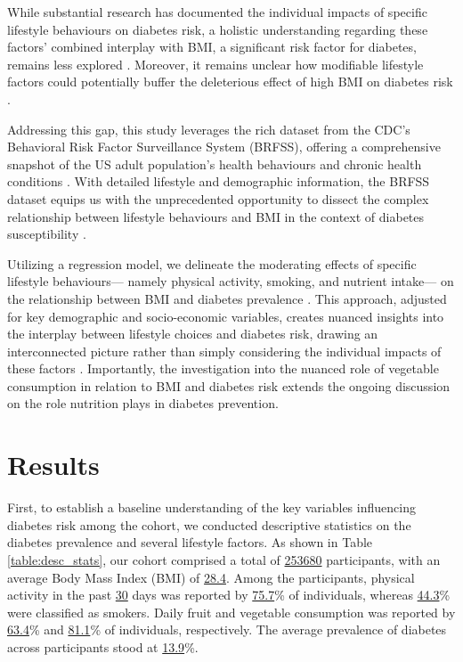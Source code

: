 \documentclass[11pt]{article}
\begin{document}
While substantial research has documented the individual impacts of specific lifestyle behaviours on diabetes risk, a holistic understanding regarding these factors' combined interplay with BMI, a significant risk factor for diabetes, remains less explored \cite{Li2017TimeTO, Bancks2021Type2D}. Moreover, it remains unclear how modifiable lifestyle factors could potentially buffer the deleterious effect of high BMI on diabetes risk \cite{Schnurr2020ObesityUL, Li2017TimeTO}.

Addressing this gap, this study leverages the rich dataset from the CDC's Behavioral Risk Factor Surveillance System (BRFSS), offering a comprehensive snapshot of the US adult population's health behaviours and chronic health conditions \cite{Matthews2017HealthRelatedBB, Iachan2016NationalWO}. With detailed lifestyle and demographic information, the BRFSS dataset equips us with the unprecedented opportunity to dissect the complex relationship between lifestyle behaviours and BMI in the context of diabetes susceptibility \cite{Tung2017RacialAE, Liu2016PrevalenceOH}.

Utilizing a regression model, we delineate the moderating effects of specific lifestyle behaviours— namely physical activity, smoking, and nutrient intake— on the relationship between BMI and diabetes prevalence \cite{Sambola2003RoleOR, Stumvoll2000UseOT}. This approach, adjusted for key demographic and socio-economic variables, creates nuanced insights into the interplay between lifestyle choices and diabetes risk, drawing an interconnected picture rather than simply considering the individual impacts of these factors \cite{Reis2011LifestyleFA, Ng2019SmokingDD}. Importantly, the investigation into the nuanced role of vegetable consumption in relation to BMI and diabetes risk extends the ongoing discussion on the role nutrition plays in diabetes prevention.

\section*{Results}

First, to establish a baseline understanding of the key variables influencing diabetes risk among the cohort, we conducted descriptive statistics on the diabetes prevalence and several lifestyle factors. As shown in Table \ref{table:desc_stats}, our cohort comprised a total of \hyperlink{R0a}{253680} participants, with an average Body Mass Index (BMI) of \hyperlink{A1a}{28.4}. Among the participants, physical activity in the past \hyperlink{A8a}{30} days was reported by \hyperlink{results0}{75.7}\% of individuals, whereas \hyperlink{results1}{44.3}\% were classified as smokers. Daily fruit and vegetable consumption was reported by \hyperlink{results2}{63.4}\% and \hyperlink{results3}{81.1}\% of individuals, respectively. The average prevalence of diabetes across participants stood at \hyperlink{results4}{13.9}\%.
\end{document}
